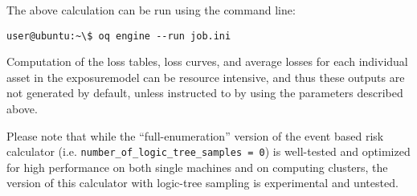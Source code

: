 The above calculation can be run using the command line:

\begin{verbatim}
user@ubuntu:~\$ oq engine --run job.ini
\end{verbatim}

Computation of the loss tables, loss curves, and average losses for each
individual \gls{asset} in the \gls{exposuremodel} can be resource intensive,
and thus these outputs are not generated by default, unless instructed to by
using the parameters described above.

Please note that while the ``full-enumeration'' version of the event based
risk calculator (i.e. \Verb+number_of_logic_tree_samples = 0+) is well-tested
and optimized for high performance on both single machines and on computing
clusters, the version of this calculator with logic-tree sampling is
experimental and untested.
